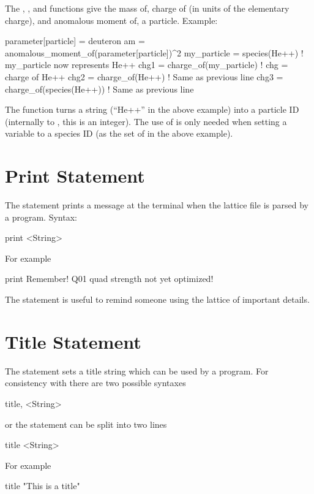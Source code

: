 {{The , , and  functions give the mass of,
charge of (in units of the elementary charge), and anomalous moment of, a particle.
Example:
\begin{example}
  parameter[particle] = deuteron
  am = anomalous_moment_of(parameter[particle])^2
  my_particle = species(He++)      ! my_particle now represents He++
  chg1 = charge_of(my_particle)    ! chg = charge of He++
  chg2 = charge_of(He++)           ! Same as previous line
  chg3 = charge_of(species(He++))  ! Same as previous line
\end{example}
The  function turns a string (``He++'' in the above example) into a particle
ID (internally to \bmad, this is an integer). The use of  is only needed when
setting a variable to a species ID (as the set of  in the above example).

\section{Print Statement}
\label{s:print}

The  statement prints a message at the terminal when the 
lattice file is parsed by a program. Syntax:
\begin{example}
  print <String>
\end{example}
For example
\begin{example}
  print Remember! Q01 quad strength not yet optimized!
\end{example}
The  statement is useful to remind someone using the lattice of important details.

\section{Title Statement}

The  statement sets a title string which can be used by a program. 
For consistency with \mad there are two possible syntaxes
\begin{example}
  title, <String>
\end{example}
or the statement can be split into two lines
\begin{example}
  title
  <String>
\end{example}
For example
\begin{example}
  title
  "This is a title"
\end{example}

}}
